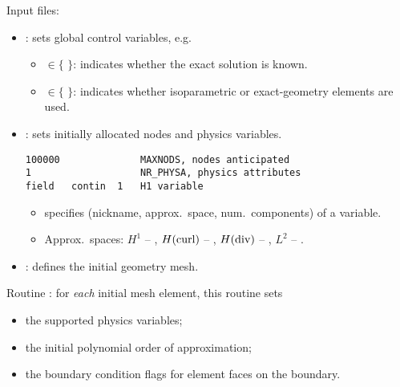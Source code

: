Input files:
\begin{itemize}
\itemsep 15pt
\item{
: sets global control variables, e.g.\\
\begin{itemize}
	\item {} $\in \{$  $\}$: indicates whether the exact solution is known.
	\item {} $\in \{$  $\}$: indicates whether isoparametric or exact-geometry elements are used.
\end{itemize}
}
\item
{
: sets initially allocated nodes and physics variables.\\[5pt]
\begin{lstlisting}[caption=\file{MPI\_POISSON/GALERKIN/input/physics} input file.]
100000              MAXNODS, nodes anticipated
1                   NR_PHYSA, physics attributes
field   contin  1   H1 variable
\end{lstlisting}
\begin{itemize}
	\vskip -5pt
	\item {} specifies (nickname, approx.~space, num.~components) of a variable.
	\item Approx.~spaces: $H^1$ -- , $H(\text{curl})$ -- , $H(\text{div})$ -- , $L^2$ -- .
\end{itemize}
}
\item
{
: defines the initial geometry mesh.
}
\end{itemize}

Routine : for \emph{each} initial mesh element, this routine sets
\begin{itemize}
	\item the supported physics variables;
	\item the initial polynomial order of approximation;
	\item the boundary condition flags for element faces on the boundary.
\end{itemize}

